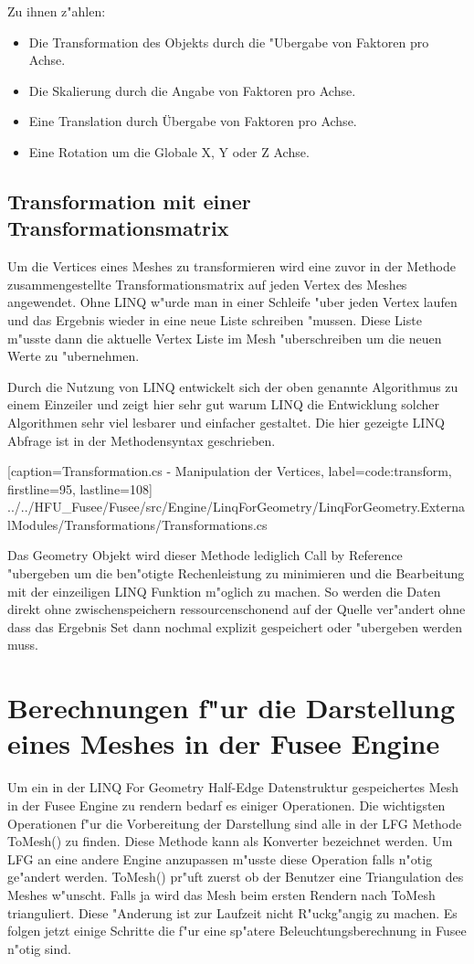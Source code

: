 \documentclass[pagesize, paper=a4, fontsize=12pt,titlepage=true, headings=small, headnosepline, abstractoff, liststotoc, nochapterprefix, plainheadsepline]{scrreprt}
\newcommand{\LFGS}{LINQ For Geometry }
\newcommand{\HES}{Half-Edge Datenstruktur }
\begin{document}
Zu ihnen z"ahlen:
\begin{itemize}
\item Die Transformation des Objekts durch die "Ubergabe von Faktoren pro Achse.
\item Die Skalierung durch die Angabe von Faktoren pro Achse.
\item Eine Translation durch Übergabe von Faktoren pro Achse.
\item Eine Rotation um die Globale X, Y oder Z Achse.
\end{itemize}

\subsection {Transformation mit einer Transformationsmatrix}
Um die Vertices eines Meshes zu transformieren wird eine zuvor in der Methode zusammengestellte Transformationsmatrix auf jeden Vertex des Meshes angewendet. Ohne LINQ w"urde man in einer Schleife "uber jeden Vertex laufen und das Ergebnis wieder in eine neue Liste schreiben "mussen. Diese Liste m"usste dann die aktuelle Vertex Liste im Mesh "uberschreiben um die neuen Werte zu "ubernehmen.

Durch die Nutzung von LINQ entwickelt sich der oben genannte Algorithmus zu einem Einzeiler und zeigt hier sehr gut warum LINQ die Entwicklung solcher Algorithmen sehr viel lesbarer und einfacher gestaltet. Die hier gezeigte LINQ Abfrage ist in der Methodensyntax geschrieben.

			[caption={Transformation.cs - Manipulation der Vertices}, label=code:transform, firstline=95, lastline=108]
			{../../HFU_Fusee/Fusee/src/Engine/LinqForGeometry/LinqForGeometry.ExternalModules/Transformations/Transformations.cs}

Das Geometry Objekt wird dieser Methode lediglich Call by Reference "ubergeben um die ben"otigte Rechenleistung zu minimieren und die Bearbeitung mit der einzeiligen LINQ Funktion m"oglich zu machen. So werden die Daten direkt ohne zwischenspeichern ressourcenschonend auf der Quelle ver"andert ohne dass das Ergebnis Set dann nochmal explizit gespeichert oder "ubergeben werden muss.
\newpage
	\section {Berechnungen f"ur die Darstellung eines Meshes in der Fusee Engine}
	Um ein in der \LFGS \HES gespeichertes Mesh in der Fusee Engine zu rendern bedarf es einiger Operationen. Die wichtigsten Operationen f"ur die Vorbereitung der Darstellung sind alle in der LFG Methode ToMesh() zu finden. Diese Methode kann als Konverter bezeichnet werden. Um LFG an eine andere Engine anzupassen m"usste diese Operation falls n"otig ge"andert werden. ToMesh() pr"uft zuerst ob der Benutzer eine Triangulation des Meshes w"unscht. Falls ja wird das Mesh beim ersten Rendern nach ToMesh trianguliert. Diese "Anderung ist zur Laufzeit nicht R"uckg"angig zu machen. Es folgen jetzt einige Schritte die f"ur eine sp"atere Beleuchtungsberechnung in Fusee n"otig sind.
\end{document}
